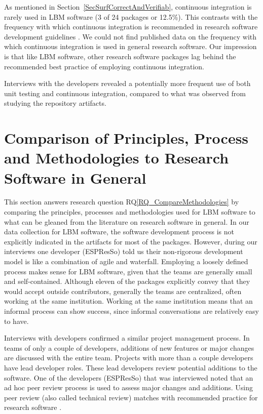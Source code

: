 \documentclass[final, 3p, times, authoryear]{elsarticle}
\newcommand{\rqref}[1]{RQ\ref{#1}}
\begin{document}
As mentioned in Section~\ref{SecSurfCorrectAndVerifiab}, continuous integration
is rarely used in LBM software (3 of 24 packages or 12.5\%). This contrasts with the frequency with which continuous integration is recommended in research software development guidelines \citep{BrettEtAl2021, Brown2015, ThielEtAl2020,
Zadka2018, vanGompelEtAl2016}.  We could not find published data on the
frequency with which continuous integration is used in general research
software.  Our impression is that like LBM software, other research software
packages lag behind the recommended best practice of employing continuous
integration.

Interviews with the developers revealed a potentially more frequent use of both
unit testing and continuous integration, compared to what was observed from
studying the repository artifacts.

\section{Comparison of Principles, Process and Methodologies to Research Software in General} \label{Sec_CompareMethodologies}

This section answers research question \rqref{RQ_CompareMethodologies} by
comparing the principles, processes and methodologies used for LBM software to
what can be gleaned from the literature on research software in general. In our
data collection for LBM software, the software development process is not
explicitly indicated in the artifacts for most of the packages. However, during
our interviews one developer (ESPResSo) told us their non-rigorous development
model is like a combination of agile and waterfall. Employing a loosely defined
process makes sense for LBM software, given that the teams are generally small
and self-contained.  Although eleven of the packages explicitly convey that they
would accept outside contributors, generally the teams are centralized, often
working at the same institution.  Working at the same institution means that an
informal process can show success, since informal conversations are relatively
easy to have.

Interviews with developers confirmed a similar project management process. In
teams of only a couple of developers, additions of new features or major changes
are discussed with the entire team. Projects with more than a couple developers
have lead developer roles. These lead developers review potential additions to
the software. One of the developers (ESPResSo) that was interviewed noted that
an ad hoc peer review process is used to assess major changes and additions.
Using peer review (also called technical review) matches with recommended
practice for research software \citep{HerouxEtAl2008, Givler2020, OrvizEtAl2017,
USGS2019}.
\end{document}
